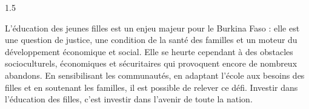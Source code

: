 \documentclass[12pt]{article}
\begin{document}
\begin{spacing}{1.5}

L'éducation des jeunes filles est un enjeu majeur pour le Burkina Faso : elle est une question de justice, une condition de la santé des familles et un moteur du développement économique et social. Elle se heurte cependant à des obstacles socioculturels, économiques et sécuritaires qui provoquent encore de nombreux abandons. En sensibilisant les communautés, en adaptant l'école aux besoins des filles et en soutenant les familles, il est possible de relever ce défi. Investir dans l'éducation des filles, c'est investir dans l'avenir de toute la nation.

\end{spacing}
\end{document}
